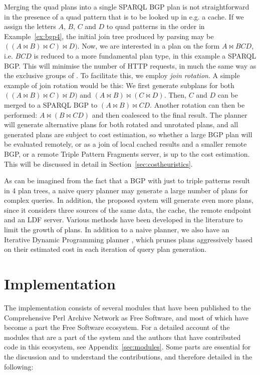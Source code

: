 Merging the quad plans into a single SPARQL BGP plan is not
straightforward in the presence of a quad pattern that is to be looked
up in e.g. a cache. If we assign the letters $A$, $B$, $C$ and $D$ to
quad patterns  in the order in
Example~\ref{ex:bgp4}, the initial join tree produced by parsing may
be $ ((A \bowtie B )\bowtie C) \bowtie D) $. Now, we are interested in
a plan on the form $A \bowtie BCD$, i.e. $BCD$ is reduced to a more
fundamental plan type, in this example a SPARQL BGP. This will
minimise the number of HTTP requests, in much the same way as the
exclusive groups of
\cite{springerlink:10.1007/978-3-642-25073-6-38}. To facilitate this,
we employ \emph{join rotation}. A simple example of join rotation
would be this: We first generate subplans for both $((A \bowtie B
)\bowtie C) \bowtie D) $ and $ (A \bowtie B )\bowtie (C \bowtie D)
$. Then, $C$ and $D$ can be merged to a SPARQL BGP to $ (A \bowtie B
)\bowtie CD $. Another rotation can then be performed: $ A \bowtie (B
\bowtie CD) $ and then coalesced to the final result. The planner will
generate alternative plans for both rotated and unrotated plans, and
all generated plans are subject to cost estimation, so whether a large
BGP plan will be evaluated remotely, or as a join of local cached
results and a smaller remote BGP, or a remote Triple Pattern Fragments
server, is up to the cost estimation. This will be discussed in detail
in Section~\ref{sec:costheuristics}.

As can be imagined from the fact that a BGP with just to triple
patterns result in 4 plan trees, a naive query planner may generate a
large number of plans for complex queries. In addition, the proposed
system will generate even more plans, since it considers three sources
of the same data, the cache, the remote endpoint and an LDF
server. Various methods have been developed in the literature to limit
the growth of plans. In addition to a naive planner, we also have an
Iterative Dynamic Programming planner
\cite{Kossmann:2000:IDP:352958.352982}, which prunes plans
aggressively based on their estimated cost in each iteration of query
plan generation.


\section{Implementation}\label{sec:impl}

The implementation consists of several modules that have been
published to the Comprehensive Perl Archive Network as Free Software,
and most of which have become a part the Free Software ecosystem. For
a detailed account of the modules that are a part of the system and
the authors that have contributed code in this ecosystem, see
Appendix~\ref{sec:modules}. Some parts are essential for the
discussion and to understand the contributions, and therefore detailed
in the following:

